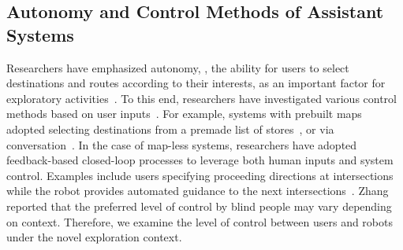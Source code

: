 \subsection{Autonomy and Control Methods of Assistant Systems}
Researchers have emphasized autonomy, \ie, the ability for users to select destinations and routes according to their interests, as an important factor for exploratory activities~\cite{Kaniwa2024ChitChatGuide,kayukawa2022HowUsers}. 
To this end, researchers have investigated various control methods based on user inputs~\cite{ranganeni2023exploring,zhang2023follower}. 
For example, systems with prebuilt maps adopted selecting destinations from a premade list of stores~\cite{sato2019navcog3,kayukawa2022HowUsers}, or via conversation~\cite{sato2019navcog3,Kaniwa2024ChitChatGuide}. 
In the case of map-less systems, researchers have adopted feedback-based closed-loop processes to leverage both human inputs and system control. 
Examples include users specifying proceeding directions at intersections while the robot provides automated guidance to the next intersections~\cite{kuribayashi2023pathfinder,jain2023want,ranganeni2023exploring,lacey2000context,hwang2022system}. 
Zhang~\etal~\cite{zhang2023follower} reported that the preferred level of control by blind people may vary depending on context.
Therefore, we examine the level of control between users and robots under the novel exploration context. 

